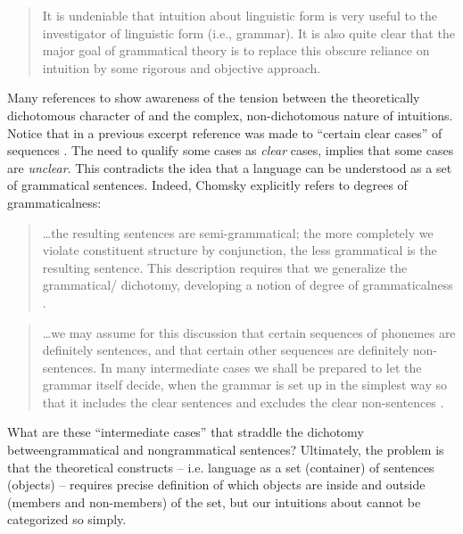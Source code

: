 \begin{quote}	
It is undeniable that intuition about linguistic form is very useful to the investigator of linguistic form (i.e., grammar). It is also quite clear that the major goal of grammatical theory is to replace this obscure reliance on intuition by some rigorous and objective approach. \citep[93-94]{Chomsky1957}
\end{quote}

  Many references to  show awareness of the tension between the theoretically dichotomous character of  and the complex, non-dichotomous nature of  intuitions. Notice that in a previous excerpt reference was made to “certain clear cases” of  sequences \citep[113]{Chomsky1956}. The need to qualify some cases as \textit{clear} cases, implies that some cases are \textit{unclear}. This contradicts the idea that a language can be understood as a set of grammatical sentences. Indeed, Chomsky explicitly refers to degrees of grammaticalness: 

\begin{quote}	
…the resulting sentences are semi-grammatical; the more completely we violate constituent structure by conjunction, the less grammatical is the resulting sentence. This description requires that we generalize the grammatical/ dichotomy, developing a notion of degree of grammaticalness \citep[36]{Chomsky1957}.
\end{quote}

\begin{quote}	
…we may assume for this discussion that certain sequences of phonemes are definitely sentences, and that certain other sequences are definitely non-sentences. In many intermediate cases we shall be prepared to let the grammar itself decide, when the grammar is set up in the simplest way so that it includes the clear sentences and excludes the clear non-sentences \citep[14]{Chomsky1957}.
\end{quote}

  What are these “intermediate cases” that straddle the dichotomy between\linebreak grammatical and nongrammatical sentences? Ultimately, the problem is that the theoretical constructs -- i.e. language as a set (container) of sentences (objects) -- requires precise definition of which objects are inside and outside (members and non-members) of the set, but our intuitions about  cannot be categorized so simply.

